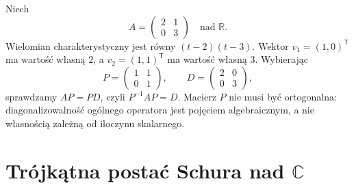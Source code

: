 \begin{przyklad}
\label{prz:lin14-diagonalization2}
Niech
\[
 A=\begin{pmatrix}2&1\\0&3\end{pmatrix}
 \quad\text{nad }\mathbb R.
\]
Wielomian charakterystyczny jest
równy \((t-2)(t-3)\).
Wektor \(v_1=(1,0)^{\mathsf T}\)
ma wartość własną \(2\), a
\(v_2=(1,1)^{\mathsf T}\)
ma wartość własną \(3\).
Wybierając
\[
 P=\begin{pmatrix}1&1\\0&1\end{pmatrix},
 \qquad
 D=\begin{pmatrix}2&0\\0&3\end{pmatrix},
\]
sprawdzamy \(AP=PD\),
czyli \(P^{-1}AP=D\).
Macierz \(P\) nie musi być ortogonalna:
diagonalizowalność ogólnego operatora
jest pojęciem algebraicznym,
a nie własnością zależną od iloczynu skalarnego.
\end{przyklad}


\section{Trójkątna postać Schura nad \texorpdfstring{\(\mathbb C\)}{C}}
\label{sec:lin14-schur}

